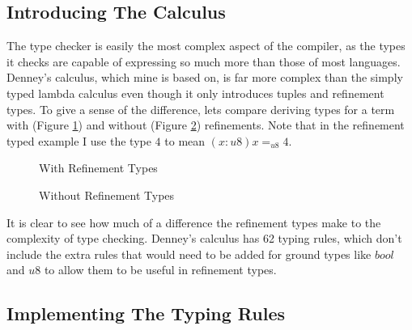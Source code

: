 \subsection{Introducing The Calculus}

The type checker is easily the most complex aspect of the compiler, as the types it checks are capable
of expressing so much more than those of most languages.
Denney's calculus, which mine is based on, is far more complex than the simply typed lambda calculus
even though it only introduces tuples and refinement types.
To give a sense of the difference, lets compare deriving types for a term
with (Figure \ref{fig:with_refinements}) and without (Figure \ref{fig:without_refinements})
refinements.
Note that in the refinement typed example I use the type $4$ to mean $(x:u8) x =_{u8} 4$.

\begin{figure}
    \centering
    \begin{prooftree}
    \end{prooftree}
    \caption{With Refinement Types}
    \label{fig:with_refinements}
\end{figure}

\begin{figure}
    \centering
    \begin{prooftree}
    \end{prooftree}
    \caption{Without Refinement Types}
    \label{fig:without_refinements}
\end{figure}

It is clear to see how much of a difference the refinement types make to the complexity of type checking.
Denney's calculus has 62 typing rules, which don't include the extra rules that would need to be added
for ground types like $bool$ and $u8$ to allow them to be useful in refinement types.

\subsection{Implementing The Typing Rules}

